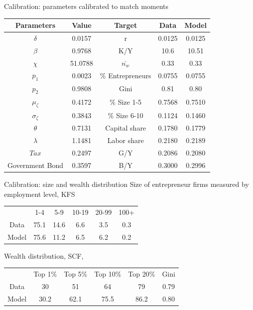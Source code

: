 \documentclass[svgnames]{beamer}
\begin{document}
\begin{frame}{Calibration: parameters calibrated to match moments}
\begin{table}[htbp]
  \centering
    \begin{tabular}{ccccc}
    \toprule
    Parameters & Value & Target & Data  & Model \\
    \midrule
    $\delta$ & 0.0157 & r     & 0.0125 & 0.0125 \\
    $\beta$ & 0.9768 & K/Y &  10.6 & 10.51 \\
    $\chi$ & 51.0788  & $\bar{n_w}$ & 0.33  & 0.33 \\
    \midrule
    $p_1$ & 0.0023  & \% Entrepreneurs & 0.0755  & 0.0755 \\
    $p_2$ & 0.9808 & Gini & 0.81 & 0.80 \\
    $\mu_{\zeta}$ & 0.4172     & \% Size 1-5 & 0.7568 & 0.7510 \\
    $\sigma_{\zeta}$ & 0.3843 & \% Size 6-10 & 0.1124 & 0.1460 \\
    \midrule
    $\theta$ & 0.7131 & Capital share & 0.1780 & 0.1779 \\
    $\lambda$ & 1.1481 & Labor share & 0.2180  & 0.2189 \\
    \midrule
    $Tax$ & 0.2497 & G/Y & 0.2086 & 0.2080 \\
    Government Bond & 0.3597 & B/Y & 0.3000 & 0.2996 \\
    \bottomrule
    \end{tabular}%
  \label{tab:addlabel}%
\end{table}%
\end{frame}

\begin{frame}{Calibration: size and wealth distribution}
Size of entrepreneur firms measured by employment level, KFS
\begin{table}[htbp]
  \centering
  
    \begin{tabular}{cccccc}
    \toprule
    & 1-4 & 5-9 & 10-19 & 20-99 & 100+ \\
    Data & 75.1 & 14.6 &  6.6  & 3.5  & 0.3 \\
    Model & 75.6 & 11.2 & 6.5 & 6.2 & 0.2 \\
    \bottomrule
    \end{tabular}%
    
\end{table}
Wealth distribution, SCF, \citet{diaz-gimenez_facts_2011}
\begin{table}[htbp]
  \centering
  
    \begin{tabular}{cccccc}
    \toprule
    & Top 1\% & Top 5\% & Top 10\% & Top 20\% & Gini\\
    Data & 30 & 51 & 64 & 79 & 0.79 \\
Model & 30.2 & 62.1 & 75.5 & 86.2 & 0.80 \\
\bottomrule
    \end{tabular}%
\end{table}
\end{frame}
\end{document}
